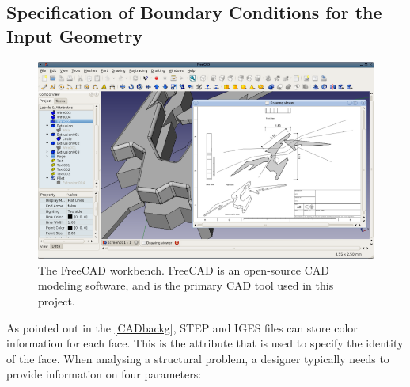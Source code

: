 \subsection{Specification of Boundary Conditions for the Input Geometry}
\label{sec: GeomCreation}

\begin{figure}
\centering
  \includegraphics[scale=0.75]{Pictures/CADToVoxel/FreeCAD.png}
\caption{The FreeCAD workbench. FreeCAD is an open-source CAD modeling software, and is the primary CAD tool used in this project.\cite{FreeCAD}}
\label{fig: freeCAD}
\end{figure}

As pointed out in the \ref{CADbackg}, STEP and IGES files can store color information for each face. This is the attribute that is used to specify the identity of the face. When analysing a structural problem, a designer typically needs to provide information on four parameters:

